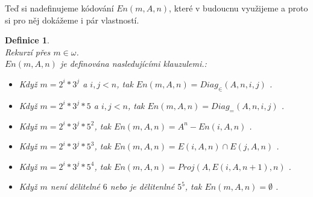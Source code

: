 \documentclass[12pt,a4paper]{article}
\newtheorem{definice}[veta]{Definice}
\begin{document}
\newpage
Te\v{d} si nadefinujeme k\'{o}dov\'{a}n\'{i} $ En(m,A,n) $, kter\'{e} v budoucnu vyu\v{z}ijeme  a proto si pro n\v{e}j dok\'{a}\v{z}eme i p\'{a}r vlastnost\'{i}.
\\
\begin{definice}%
~\\
\label{def:En}
Rekurz\'{i} p\v{r}es $ m \in \omega $. \\ $ En(m,A,n) $ je definov\'{a}na nasleduj\'{i}c\'{i}mi klauzulemi.: 
\begin{itemize}
\item Kdy\v{z} $ m=2^i*3^j $ a $ i,j < n $, tak $ En(m,A,n) = Diag_{\in}(A,n,i,j)$ . 
\item Kdy\v{z} $ m=2^i*3^j*5 $ a $ i,j < n $, tak $ En(m,A,n) = Diag_{=}(A,n,i,j)$ . 
\item Kdy\v{z} $ m=2^i*3^j*5^2 $, tak $ En(m,A,n) = A^n - En(i,A,n)$ . 
\item Kdy\v{z} $ m=2^i*3^j*5^3 $, tak $ En(m,A,n) = E(i,A,n) \cap E(j,A,n)$ . 
\item  Kdy\v{z} $ m=2^i*3^j*5^4 $, tak $ En(m,A,n) = Proj(A,E(i,A,n+1),n)$ . 
\item Kdy\v{z} $ m $ nen\'{i} d\v{e}liteln\'{e} $ 6 $ nebo je d\v{e}litenln\'{e} $ 5^5 $, tak  $ En(m,A,n)= \emptyset $ .  
\end{itemize}
\end{definice}
\end{document}
